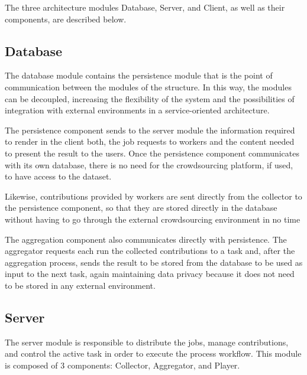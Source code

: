 The three architecture modules Database, Server, and Client, as well as their components, are described below.

\subsection{Database}
The database module contains the persistence module that is the point of communication between the modules of the structure. In this way, the modules can be decoupled, increasing the flexibility of the system and the possibilities of integration with external environments in a service-oriented architecture. 


The persistence component sends to the server module the information required to render in the client both, the job requests to workers and the content needed to present the result to the users. Once the persistence component communicates with its own database, there is no need for the crowdsourcing platform, if used, to have access to the dataset.

Likewise, contributions provided by workers are sent directly from the collector to the persistence component, so that they are stored directly in the database without having to go through the external crowdsourcing environment in no time

The aggregation component also communicates directly with persistence. The aggregator requests each run the collected contributions to a task and, after the aggregation process, sends the result to be stored from the database to be used as input to the next task, again maintaining data privacy because it does not need to be stored in any external environment.

\subsection{Server}
The server module is responsible to distribute the jobs, manage contributions, and control the active task in order to execute the process workflow. This module is composed of 3 components: Collector, Aggregator, and Player. 

